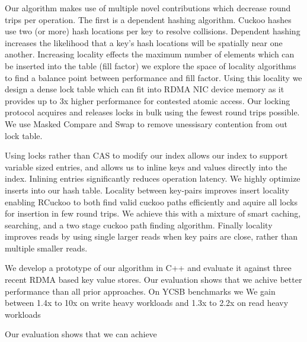 Our algorithm makes use of multiple novel contributions
which decrease round trips per operation. The first is a
dependent hashing algorithm. Cuckoo hashes use two (or more)
hash locations per key to resolve collisions. Dependent
hashing increases the likelihood that a key's hash locations
will be spatially near one another. Increasing locality
effects the maximum number of elements which can be inserted
into the table (fill factor) we explore the space of
locality algorithms to find a balance point between
performance and fill factor. Using this locality we design a
dense lock table which can fit into RDMA NIC device memory
as it provides up to 3x higher performance for contested
atomic access. Our locking protocol acquires and releases
locks in bulk using the fewest round trips possible. We use
Masked Compare and Swap to remove unessisary contention from
out lock table.

Using locks rather than CAS to modify our index allows our
index to support variable sized entries, and allows us to
inline keys and values directly into the index. Inlining
entries significantly reduces operation latency. We highly
optimize inserts into our hash table. Locality between
key-pairs improves insert locality enabling RCuckoo to both
find valid cuckoo paths efficiently and aquire all locks for
insertion in few round trips. We achieve this with a mixture
of smart caching, searching, and a two stage cuckoo path
finding algorithm. Finally locality improves reads by using
single larger reads when key pairs are close, rather than
multiple smaller reads.



We develop a prototype of our algorithm in C++ and evaluate
it against three recent RDMA based key value stores. Our
evaluation shows that we achive better performance than all
prior approaches. On YCSB benchmarks we We gain between 1.4x
to 10x on write heavy workloads and 1.3x to 2.2x on read
heavy workloads

Our
evaluation shows that we can achieve ~
